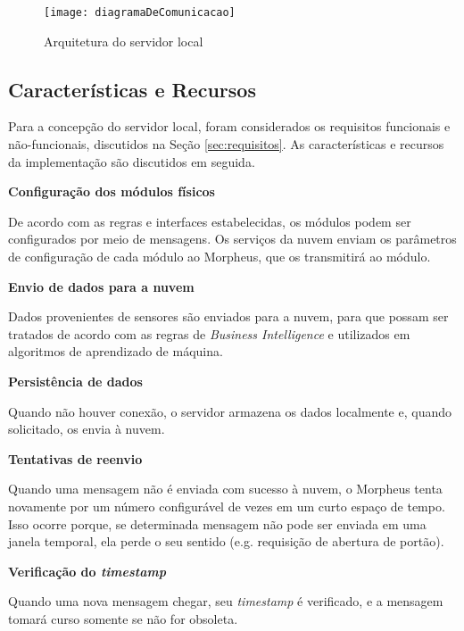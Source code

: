 \begin{figure}
	\centering
	\caption{Arquitetura do servidor local}
  \texttt{[image: diagramaDeComunicacao]}
\label{fig:diagramaDeComunicacao}
\end{figure}

\subsection{Características e Recursos}
Para a concepção do servidor local, foram considerados os requisitos funcionais e não-funcionais, discutidos na Seção \ref{sec:requisitos}. As características e recursos da implementação são discutidos em seguida.

\begin{description}

\item \textbf{Configuração dos módulos físicos}

De acordo com as regras e interfaces estabelecidas, os módulos podem ser configurados por meio de mensagens. Os serviços da nuvem enviam os parâmetros de configuração de cada módulo ao Morpheus, que os transmitirá ao módulo.

\item \textbf{Envio de dados para a nuvem}

Dados provenientes de sensores são enviados para a nuvem, para que possam ser tratados de acordo com as regras de \emph{Business Intelligence} e utilizados em algoritmos de aprendizado de máquina.

\item \textbf{Persistência de dados}

Quando não houver conexão, o servidor armazena os dados localmente e, quando solicitado, os envia à nuvem.

\item \textbf{Tentativas de reenvio}

Quando uma mensagem não é enviada com sucesso à nuvem, o Morpheus tenta novamente por um número configurável de vezes em um curto espaço de tempo. Isso ocorre porque, se determinada mensagem não pode ser enviada em uma janela temporal, ela perde o seu sentido (e.g. requisição de abertura de portão).

\item \textbf{Verificação do \emph{timestamp}}

Quando uma nova mensagem chegar, seu \emph{timestamp} é verificado, e a mensagem tomará curso somente se não for obsoleta.


\end{description}
